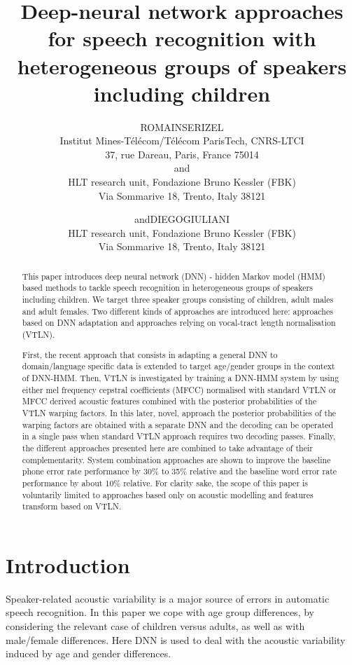 \documentclass{nle}
\title[DNN approaches for ASR with heterogeneous groups of speakers]{Deep-neural network approaches for speech recognition with heterogeneous groups of speakers including children}
\author[Romain Serizel and Diego Giuliani]{R\ls O\ls M\ls A\ls I\ls N\ns S\ls E\ls R\ls I\ls Z\ls E\ls L\\
Institut Mines-Télécom/Télécom ParisTech, CNRS-LTCI\\
37, rue Dareau, Paris, France 75014\\
and \\
HLT research unit, Fondazione Bruno Kessler (FBK)\\
Via Sommarive 18, Trento, Italy 38121
\and
and\ns D\ls I\ls E\ls G\ls O\ns G\ls I\ls U\ls L\ls I\ls A\ls N\ls I\\
HLT research unit, Fondazione Bruno Kessler (FBK)\\
Via Sommarive 18, Trento, Italy 38121}
\begin{document}
\label{firstpage}
\maketitle
\begin{abstract} %
This paper introduces deep neural network  (DNN) -  hidden  Markov model (HMM) based methods to tackle speech recognition in heterogeneous groups of speakers including children. We target three speaker groups consisting of children, adult males and adult females. Two different kinds of approaches are introduced here: approaches based on DNN adaptation and approaches relying on vocal-tract length normalisation (VTLN).

First, the recent approach that consists
in adapting a general DNN to domain/language specific data is extended
to target  age/gender groups  in the context  of DNN-HMM. Then, VTLN is investigated by training a DNN-HMM system by using either mel frequency cepstral coefficients (MFCC) normalised with standard VTLN or MFCC derived acoustic features combined with the posterior probabilities of the VTLN warping factors. In this later, novel, approach the posterior probabilities of the warping factors are obtained with a separate DNN and the decoding can be operated in a single pass when standard VTLN approach requires two decoding passes. Finally, the different approaches presented here are combined to take advantage of their complementarity. System combination approaches are shown to improve the baseline phone error rate performance by 30\% to 35\% relative and the baseline word error rate performance by about 10\% relative. For clarity sake, the scope of this paper is voluntarily limited to approaches based only on acoustic modelling and features transform based on VTLN.
\end{abstract}

\section{Introduction}
Speaker-related  acoustic variability is a major  source of
errors in automatic  speech recognition.  In this  paper we cope
with  age  group differences,  by  considering  the  relevant case  of
children versus adults, as well as with male/female differences. 
Here DNN is used to deal with the acoustic variability induced by  age and gender differences.
\end{document}
